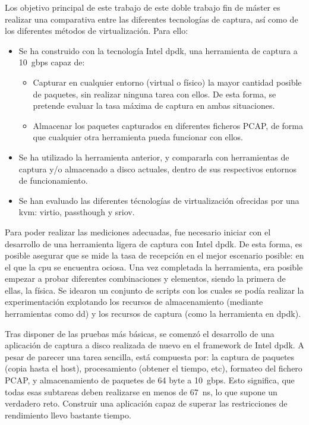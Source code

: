 \newpage
{}

Los objetivo principal de este trabajo de este doble trabajo fin de máster es realizar una comparativa entre las diferentes tecnologías de captura, así como de los diferentes métodos de virtualización. Para ello:

\begin{itemize}
\item Se ha construido con la tecnología Intel \gls{dpdk}, una herramienta de captura a 10~\gls{gbps} capaz de:
\begin{itemize}
\item Capturar en cualquier entorno (virtual o físico) la mayor cantidad posible de paquetes, sin realizar ninguna tarea con ellos. De esta forma, se pretende evaluar la tasa máxima de captura en ambas situaciones.
\item Almacenar los paquetes capturados en diferentes ficheros PCAP, de forma que cualquier otra herramienta pueda funcionar con ellos.
\end{itemize}
\item Se ha utilizado la herramienta anterior, y compararla con herramientas de captura y/o almacenado a disco actuales, dentro de sus respectivos entornos de funcionamiento.
\item Se han evaluado las diferentes técnologías de virtualización ofrecidas por una \gls{kvm}: \gls{virtio}, \gls{passthough} y \gls{sriov}.
\end{itemize}


Para poder realizar las mediciones adecuadas, fue necesario iniciar con el desarrollo de una herramienta ligera de captura con Intel \gls{dpdk}. De esta forma, es posible asegurar que se mide la tasa de recepción en el mejor escenario posible: en el que la \gls{cpu} se encuentra ociosa.
Una vez completada la herramienta, era posible empezar a probar diferentes combinaciones y elementos, siendo la primera de ellas, la física. Se idearon un conjunto de scripts con los cuales se podía realizar la experimentación explotando los recursos de almacenamiento (mediante herramientas como dd) y los recursos de captura (como la herramienta en \gls{dpdk}).

Tras disponer de las pruebas más básicas, se comenzó el desarrollo de una aplicación de captura a disco realizada de nuevo en el framework de Intel \gls{dpdk}. A pesar de parecer una tarea sencilla, está compuesta por: la captura de paquetes (copia hasta el host), procesamiento (obtener el tiempo, etc), formateo del fichero PCAP, y almacenamiento de paquetes de 64 byte a 10~\gls{gbps}. Esto significa, que todas esas subtareas deben realizarse en menos de 67~ns, lo que supone un verdadero reto. Construir una aplicación capaz de superar las restricciones de rendimiento llevo bastante tiempo.

